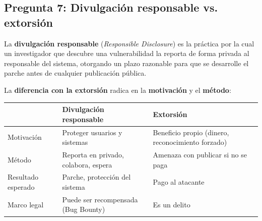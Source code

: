 \documentclass[11pt,a4paper]{article}
\begin{document}
\subsection*{Pregunta 7: Divulgación responsable vs. extorsión}
\begin{respuesta}
La \textbf{divulgación responsable} (\textit{Responsible Disclosure}) es la práctica por la cual un investigador que descubre una vulnerabilidad la reporta de forma privada al responsable del sistema, otorgando un plazo razonable para que se desarrolle el parche antes de cualquier publicación pública.

La \textbf{diferencia con la extorsión} radica en la \textbf{motivación} y el \textbf{método}:

\begin{center}
\renewcommand{\arraystretch}{1.2}
\begin{tabularx}{\textwidth}{@{} p{4cm} X X @{}}
\toprule
& \textbf{Divulgación responsable} & \textbf{Extorsión} \\
\midrule
Motivación & Proteger usuarios y sistemas & Beneficio propio (dinero, reconocimiento forzado) \\
Método & Reporta en privado, colabora, espera & Amenaza con publicar si no se paga \\
Resultado esperado & Parche, protección del sistema & Pago al atacante \\
Marco legal & Puede ser recompensada (Bug Bounty) & Es un delito \\
\bottomrule
\end{tabularx}
\end{center}
\end{respuesta}
\end{document}
